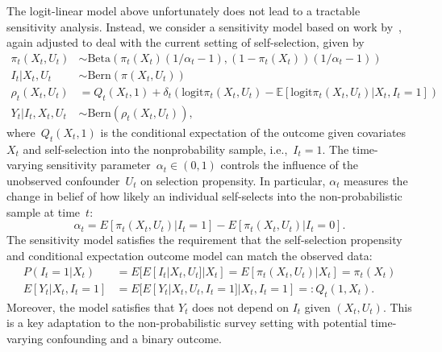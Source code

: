 \documentclass[11pt]{amsart}
\numberwithin{equation}{section}
\theoremstyle{plain}
\def\logit{\text{logit}}
\def\EE{\mathbb{E}}
\begin{document}
The logit-linear model above unfortunately does not lead to a tractable sensitivity analysis.  Instead, we consider a sensitivity model based on work by~\cite{Veitch2020}, again adjusted to deal with the current setting of self-selection, given by
\begin{equation}
\begin{aligned}
\label{eq:sensmodel}
\pi_t(X_t, U_t) &\sim \text{Beta} \left( \pi_t (X_t) (1/\alpha_t - 1), (1-\pi_t(X_t)) (1/\alpha_t - 1) \right) \\
I_t | X_t, U_t &\sim \text{Bern} (\pi (X_t,U_t)) \\
\rho_t(X_t, U_t) &= Q_t(X_t,1) + \delta_t \left( \logit \pi_t(X_t,U_t) - \EE \left[ \logit \pi_t(X_t,U_t) | X_t, I_t = 1 \right] \right) \\
Y_t | I_t, X_t, U_t &\sim \text{Bern}(\rho_t(X_t, U_t)),
\end{aligned}
\end{equation}
where~$Q_t(X_t,1)$ is the conditional expectation of the outcome given covariates~$X_t$ and self-selection into the nonprobability sample, i.e.,~$I_t = 1$. The time-varying sensitivity parameter~$\alpha_t \in (0,1)$  controls the influence of the unobserved confounder~$U_t$ on selection propensity. In particular, $\alpha_t$ measures the change in belief of how likely an individual self-selects into the non-probabilistic sample at time~$t$:
$$
\alpha_t = E[ \pi_t (X_t,U_t) | I_t = 1] - E[ \pi_t (X_t,U_t) | I_t = 0].
$$
The sensitivity model satisfies the requirement that the self-selection propensity and conditional expectation outcome model can match the observed data:
\begin{align*}
P(I_t = 1 | X_t ) &= E[ E[ I_t | X_t, U_t ] | X_t ] = E[ \pi_t(X_t, U_t) | X_t ] = \pi_t (X_t) \\
E[Y_t | X_t, I_t = 1 ] &= E[ E[ Y_t | X_t, U_t, I_t =1 ] | X_t, I_t = 1 ] =: Q_t(1,X_t).
\end{align*}
Moreover, the model satisfies that $Y_t$ does not depend on $I_t$ given $(X_t, U_t)$. This is a key adaptation to the non-probabilistic survey setting with potential time-varying confounding and a binary outcome.
\end{document}
